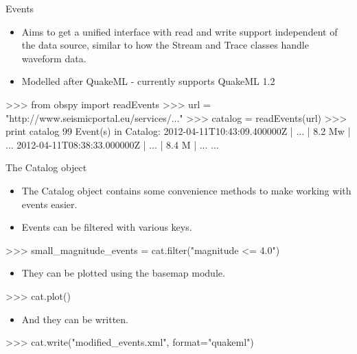\documentclass[handout]{beamer}
\begin{document}
\begin{frame}{Events}
    \begin{itemize}
        \item Aims to get a unified interface with read and write support independent of the data source, similar to how the Stream and Trace classes handle waveform data.
        \item Modelled after QuakeML - currently supports QuakeML 1.2
    \end{itemize}
\begin{myColorBox}{0.95}{}
\begin{python}
>>> from obspy import readEvents
>>> url = "http://www.seismicportal.eu/services/..."
>>> catalog = readEvents(url)
>>> print catalog
99 Event(s) in Catalog:
2012-04-11T10:43:09.400000Z |  ... | 8.2 Mw | ...
2012-04-11T08:38:33.000000Z |  ... | 8.4 M  | ...
...
\end{python}
\end{myColorBox}
\end{frame}

\begin{frame}{The Catalog object}
    \begin{itemize}
        \item The Catalog object contains some convenience methods to make working with events easier.
        \item Events can be filtered with various keys.
    \end{itemize}
\begin{myColorBox}{0.95}{}
\begin{python}
>>> small_magnitude_events = cat.filter("magnitude <= 4.0")
\end{python}
\end{myColorBox}

    \begin{itemize}
        \item They can be plotted using the basemap module.
    \end{itemize}
\begin{myColorBox}{0.95}{}
\begin{python}
    >>> cat.plot()
\end{python}
\end{myColorBox}
    \begin{itemize}
        \item And they can be written.
    \end{itemize}
\begin{myColorBox}{0.95}{}
\begin{python}
>>> cat.write("modified_events.xml", format="quakeml")
\end{python}
\end{myColorBox}
\end{frame}
\end{document}
